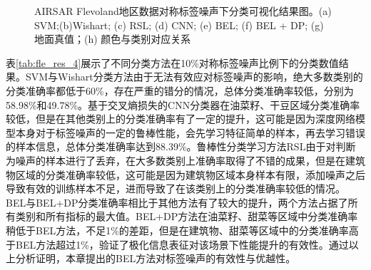 \begin{figure}[ht]

    \caption{AIRSAR Flevoland地区数据对称标签噪声下分类可视化结果图。(a) SVM;(b)Wishart; (c) RSL; (d) CNN; (e) BEL; (f) BEL + DP; (g) 地面真值；(h) 颜色与类别对应关系}
    \label{fig:fle_res_4}
\end{figure}

表\ref{tab:fle_res_4}展示了不同分类方法在10\%对称标签噪声比例下的分类数值结果。SVM与Wishart分类方法由于无法有效应对标签噪声的影响，绝大多数类别的分类准确率都低于60\%，存在严重的错分的情况，总体分类准确率较低，分别为58.98\%和49.78\%。基于交叉熵损失的CNN分类器在油菜籽、干豆区域分类准确率较低，但是在其他类别上的分类准确率有了一定的提升，这可能是因为深度网络模型本身对于标签噪声的一定的鲁棒性能，会先学习特征简单的样本，再去学习错误的样本信息，总体分类准确率达到88.39\%。鲁棒性分类学习方法RSL由于对判断为噪声的样本进行了丢弃，在大多数类别上准确率取得了不错的成果，但是在建筑物区域的分类准确率较低，这可能是因为建筑物区域本身样本有限，添加噪声之后导致有效的训练样本不足，进而导致了在该类别上的分类准确率较低的情况。BEL与BEL+DP分类准确率相比于其他方法有了较大的提升，两个方法占据了所有类别和所有指标的最大值。BEL+DP方法在油菜籽、甜菜等区域中分类准确率稍低于BEL方法，不足1\%的差距，但是在建筑物、甜菜等区域中的分类准确率高于BEL方法超过1\%，验证了极化信息表征对该场景下性能提升的有效性。通过以上分析证明，本章提出的BEL方法对标签噪声的有效性与优越性。

